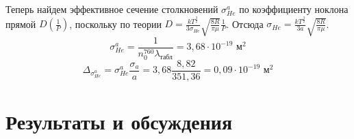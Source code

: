 \documentclass[a4paper]{article}
\begin{document}
\begin{enumerate}
Теперь найдем эффективное сечение столкновений $\sigma_{He}^a$ по коэффициенту ноклона прямой $D(\frac{1}{P})$, поскольку по теории $D = \frac{kT^{\frac{3}{2}}}{3\sigma_{He}}\sqrt{\frac{8R}{\pi \mu}}\frac{1}{P}$. Отсюда $\sigma_{He} = \frac{kT^{\frac{3}{2}}}{3a}\sqrt{\frac{8R}{\pi \mu}}$.
\begin{equation*}
	\sigma_{He}^a = \frac{1}{n_0^{760}\lambda_{\text{табл}}} = 3,68 \cdot 10^{-19} \text{ м}^2
\end{equation*}
\begin{equation*}
	\Delta_{\sigma_{He}^a} = \sigma_{He}^a\frac{\sigma_a}{a} = 3,68 \frac{8,82}{351,36} = 0,09 \cdot 10^{-19} \text{ м}^2
\end{equation*}
\end{enumerate}

\section{Результаты и обсуждения}
\end{document}
